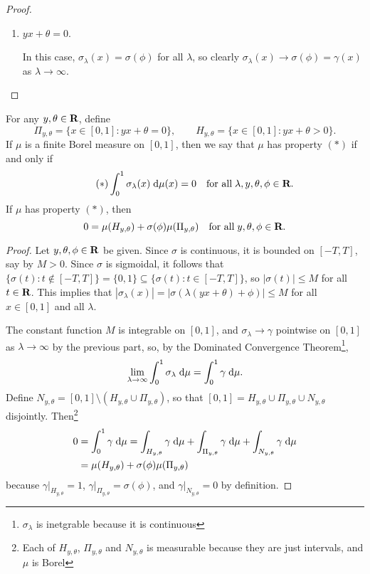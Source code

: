 \documentclass{homework}
\begin{document}
\begin{arabicparts}
\begin{proof}
\begin{enumerate}[label=\Roman*.]
				\item $yx + \theta = 0$.
				
				In this case, $\sigma_\lambda(x) = \sigma(\phi)$ for all $\lambda$, so clearly $\sigma_\lambda(x) \to \sigma(\phi) = \gamma(x)$ as $\lambda \to \infty$.
			\end{enumerate}
		\end{proof}
		
		\newcommand{\zeroset}{{\Pi_{y,\theta}}}
		\newcommand{\posset}{{H_{y,\theta}}}
		\newcommand{\negset}{{N_{y,\theta}}}
		\newcommand{\propstar}{(*)}
		\questionpart 
		For any $y, \theta \in \textbf{R}$, define
		\begin{equation}
			\zeroset = \{x \in [0,1] : yx + \theta = 0\}, \qquad \posset = \{x \in [0,1] : yx + \theta > 0\}.
		\end{equation}
		If $\mu$ is a finite Borel measure on $[0,1]$, then we say that $\mu$ has property $\propstar$ if and only if
		\begin{equation}
			\tag{$*$}
			\int_0^1\sigma_\lambda(x)\;\text{d}\mu(x) = 0 \quad \text{for all}\;\lambda, y, \theta, \phi \in \textbf{R}.
		\end{equation}
		If $\mu$ has property $\propstar$, then
		\begin{equation}
			0 = \mu(\posset) + \sigma(\phi)\mu(\zeroset) \quad \text{for all}\; y, \theta,\phi \in \R.
		\end{equation}
		\begin{proof}
			Let $y, \theta, \phi \in \textbf{R}$ be given. Since $\sigma$ is continuous, it is bounded on $[-T,T]$, say by $M > 0$. Since $\sigma$ is sigmoidal, it follows that $\{\sigma(t) : t \notin [-T,T]\} = \{0,1\} \subseteq \{\sigma(t) : t \in [-T,T]\}$, so $|\sigma(t)| \le M$ for all $t \in \textbf{R}$. This implies that $|\sigma_\lambda(x)| = |\sigma(\lambda(yx+\theta) + \phi)| \le M$ for all $x \in [0,1]$ and all $\lambda$.
			
			The constant function $M$ is integrable on $[0,1]$, and $\sigma_\lambda \to \gamma$ pointwise on $[0,1]$ as $\lambda \to \infty$ by the previous part, so, by the Dominated Convergence Theorem\footnote{$\sigma_\lambda$ is inetgrable because it is continuous},
			\begin{equation}
				\lim_{\lambda\to\infty} \int_0^1\sigma_\lambda \;\text{d}\mu = \int_0^1\gamma\;\text{d}\mu.
			\end{equation}
			Define $\negset = [0,1]\setminus(\posset \cup \zeroset)$, so that $[0,1] = \posset \cup \zeroset \cup \negset$ disjointly. Then\footnote{Each of $\posset$, $\zeroset$ and $\negset$ is measurable because they are just intervals, and $\mu$ is Borel}
			\begin{align}
				0 &= \int_0^1\gamma\dee\mu = \int_\posset \gamma\dee\mu + \int_\zeroset\gamma\dee\mu + \int_\negset\gamma\dee\mu\\
				&= \mu(\posset) + \sigma(\phi)\mu(\zeroset)
			\end{align}
			because $\gamma\big\vert_\posset = 1$, $\gamma\big\vert_\zeroset = \sigma(\phi)$, and $\gamma\big\vert_\negset = 0$ by definition.
		\end{proof}
		

\end{arabicparts}
\end{document}
